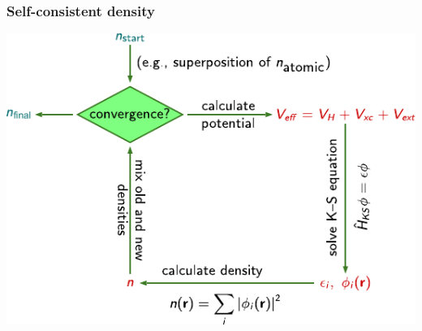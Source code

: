 \documentclass[noamsthm,8pt,t,xcolor={dvipsnames}]{beamer}
\begin{document}
\begin{frame}
   \frametitle{Self-consistent density}
   \vspace{0.7cm}
   \begin{center}
      \includegraphics[width=0.7\linewidth]{figures/scf.pdf}
   \end{center}
\end{frame}
\end{document}
